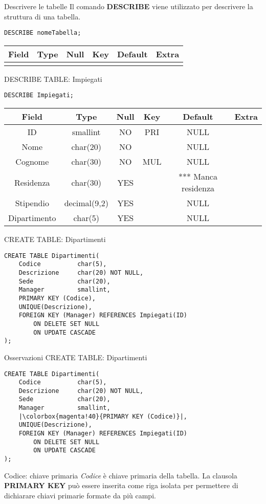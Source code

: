 %
\begin{frame}[fragile]{Descrivere le tabelle}
Il comando \textbf{DESCRIBE} viene utilizzato per descrivere la struttura di una tabella.
\begin{lstlisting}
DESCRIBE nomeTabella;
\end{lstlisting}
\begin{tabular}{|c|c|c|c|c|c|}
    \hline
    \rowcolor{cyan!30} Field & Type & Null & Key & Default & Extra \\ \hline
    & & & & & \\ \hline
\end{tabular}
\end{frame}
%
\begin{frame}[fragile]{DESCRIBE TABLE: Impiegati}
\begin{lstlisting}
DESCRIBE Impiegati;
\end{lstlisting}
\begin{tabular}{|c|c|c|c|c|c|}
    \hline
    \rowcolor{cyan!30} Field & Type & Null & Key & Default & Extra \\
    \hline
    ID & smallint & NO & PRI & NULL & \\ \hline
    Nome & char(20) & NO & & NULL & \\ \hline
    Cognome & char(30) & NO & MUL & NULL & \\ \hline
    Residenza & char(30) & YES & & *** Manca residenza & \\ \hline
    Stipendio & decimal(9,2) & YES & & NULL & \\ \hline
    Dipartimento & char(5) & YES & & NULL & \\ \hline
\end{tabular}
\end{frame}
%
\begin{frame}[fragile]{CREATE TABLE: Dipartimenti}
\begin{lstlisting}
CREATE TABLE Dipartimenti(
    Codice          char(5),
    Descrizione     char(20) NOT NULL,
    Sede            char(20),
    Manager         smallint,
    PRIMARY KEY (Codice),
    UNIQUE(Descrizione),
    FOREIGN KEY (Manager) REFERENCES Impiegati(ID)
        ON DELETE SET NULL
        ON UPDATE CASCADE
);    
\end{lstlisting}
\end{frame}
%
\begin{frame}[fragile]{Osservazioni CREATE TABLE: Dipartimenti}
\vspace{-.6cm}
\begin{lstlisting}
CREATE TABLE Dipartimenti(
    Codice          char(5),
    Descrizione     char(20) NOT NULL,
    Sede            char(20),
    Manager         smallint,
    |\colorbox{magenta!40}{PRIMARY KEY (Codice)}|,
    UNIQUE(Descrizione),
    FOREIGN KEY (Manager) REFERENCES Impiegati(ID)
        ON DELETE SET NULL
        ON UPDATE CASCADE
);    
\end{lstlisting}
\begin{block}{Codice: chiave primaria}
    \textit{Codice} \`e chiave primaria della tabella. La clausola \textbf{PRIMARY KEY} pu\`o essere inserita come riga isolata per permettere di dichiarare chiavi primarie formate da pi\`u campi.
\end{block}
\end{frame}
